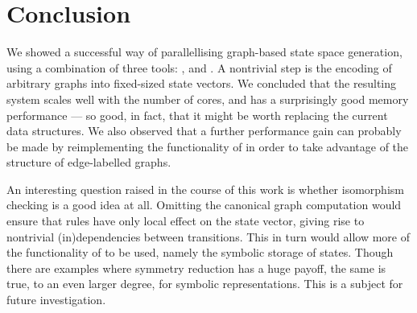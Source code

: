 \section{Conclusion}

We showed a successful way of parallellising graph-based state space
generation, using a combination of three tools: \GROOVE, \BLISS and \LTSMIN. A
nontrivial step is the encoding of arbitrary graphs into fixed-sized state
vectors.  We concluded that the resulting system scales well with the number of
cores, and has a surprisingly good memory performance --- so good, in fact,
that it might be worth replacing the current \GROOVE data structures. We also
observed that a further performance gain can probably be made by reimplementing
the functionality of \BLISS in order to take advantage of the structure of
edge-labelled graphs.

An interesting question raised in the course of this work is whether
isomorphism checking is a good idea at all. Omitting the canonical graph
computation would ensure that rules have only local effect on the state
vector, giving rise to nontrivial (in)dependencies between transitions. This
in turn would allow more of the functionality of \LTSMIN to be used, namely
the symbolic storage of states. 
Though there are examples where symmetry
reduction has a huge payoff, the same is true, to an even larger degree, for
symbolic representations. This is a subject for future investigation.

